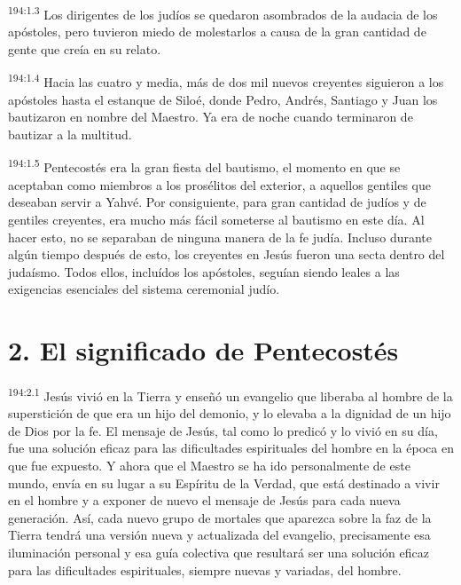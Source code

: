 \par 
\textsuperscript{194:1.3} Los dirigentes de los judíos se quedaron asombrados de la audacia de los apóstoles, pero tuvieron miedo de molestarlos a causa de la gran cantidad de gente que creía en su relato.

\par 
\textsuperscript{194:1.4} Hacia las cuatro y media, más de dos mil nuevos creyentes siguieron a los apóstoles hasta el estanque de Siloé, donde Pedro, Andrés, Santiago y Juan los bautizaron en nombre del Maestro. Ya era de noche cuando terminaron de bautizar a la multitud.

\par 
\textsuperscript{194:1.5} Pentecostés era la gran fiesta del bautismo, el momento en que se aceptaban como miembros a los prosélitos del exterior, a aquellos gentiles que deseaban servir a Yahvé. Por consiguiente, para gran cantidad de judíos y de gentiles creyentes, era mucho más fácil someterse al bautismo en este día. Al hacer esto, no se separaban de ninguna manera de la fe judía. Incluso durante algún tiempo después de esto, los creyentes en Jesús fueron una secta dentro del judaísmo. Todos ellos, incluídos los apóstoles, seguían siendo leales a las exigencias esenciales del sistema ceremonial judío.

\section*{2. El significado de Pentecostés}
\par 
\textsuperscript{194:2.1} Jesús vivió en la Tierra y enseñó un evangelio que liberaba al hombre de la superstición de que era un hijo del demonio, y lo elevaba a la dignidad de un hijo de Dios por la fe. El mensaje de Jesús, tal como lo predicó y lo vivió en su día, fue una solución eficaz para las dificultades espirituales del hombre en la época en que fue expuesto. Y ahora que el Maestro se ha ido personalmente de este mundo, envía en su lugar a su Espíritu de la Verdad, que está destinado a vivir en el hombre y a exponer de nuevo el mensaje de Jesús para cada nueva generación. Así, cada nuevo grupo de mortales que aparezca sobre la faz de la Tierra tendrá una versión nueva y actualizada del evangelio, precisamente esa iluminación personal y esa guía colectiva que resultará ser una solución eficaz para las dificultades espirituales, siempre nuevas y variadas, del hombre.

